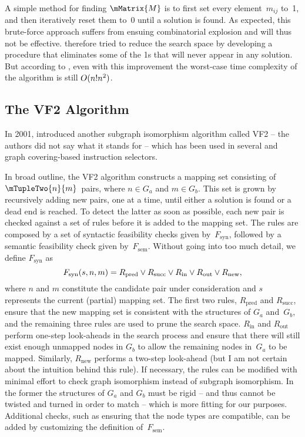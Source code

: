 A simple method for finding $\mMatrix{M}$ is to first set every element~$m_{ij}$
to~1, and then iteratively reset them to~0 until a solution is found.
%
As
expected, this brute-force approach suffers from ensuing combinatorial explosion
and will thus not be effective.
%
\citeauthor{Ullmann1976} therefore tried to
reduce the search space by developing a procedure that eliminates some of the 1s
that will never appear in any solution.
%
But according to
\textcite{Cordella2001}, even with this improvement the worst-case time
complexity of the algorithm is still \mbox{$O(n!n^2)$}.

\subsection{The VF2 Algorithm}

In 2001, \textcite{Cordella2001} introduced another \gls{subgraph isomorphism}
algorithm called \gls{VF2} -- the authors did not say what it stands for -- which
has been used in several  and \gls{graph covering}-based
instruction selectors.

In broad outline, the \gls{VF2} algorithm constructs a mapping set consisting of
\mbox{$\mTupleTwo{n}{m}$}~pairs, where \mbox{$n \in G_a$} and \mbox{$m \in
  G_b$}.
%
This set is grown by recursively adding new pairs, one at a time, until
either a solution is found or a dead end is reached.
%
To detect the latter as
soon as possible, each new pair is checked against a set of rules before it is
added to the mapping set.
%
The rules are composed by a set of syntactic
feasibility checks given by~$F_{\text{syn}}$, followed by a semantic feasibility
check given by~$F_{\text{sem}}$.
%
Without going into too much detail, we define
$F_{\text{syn}}$ as
\begin{displaymath}
  F_{\text{syn}}(s, n, m) = R_{\text{pred}} \vee R_{\text{succ}} \vee
  R_{\text{in}} \vee R_{\text{out}} \vee R_{\text{new}},
\end{displaymath}
where $n$ and $m$ constitute the candidate pair under consideration and $s$
represents the current (partial) mapping set.
%
The first two rules,
$R_{\text{pred}}$ and $R_{\text{succ}}$, ensure that the new mapping set is
consistent with the structures of $G_a$ and~$G_b$, and the remaining three rules
are used to prune the search space.
%
$R_{\text{in}}$ and $R_{\text{out}}$ perform
one-step look-aheads in the search process and ensure that there will still
exist enough unmapped nodes in $G_b$ to allow the remaining \glspl{node}
in~$G_a$ to be mapped.
%
Similarly, $R_{\text{new}}$ performs a two-step
look-ahead (but I am not certain about the intuition behind this rule).
%
If
necessary, the rules can be modified with minimal effort to check \gls{graph
  isomorphism} instead of \gls{subgraph isomorphism}.
%
In the former the
structures of $G_a$ and $G_b$ must be rigid -- and thus cannot be twisted and
turned in order to match -- which is more fitting for our purposes.
%
Additional
checks, such as ensuring that the \gls{node} types are compatible, can be added
by customizing the definition of~$F_{\text{sem}}$.

